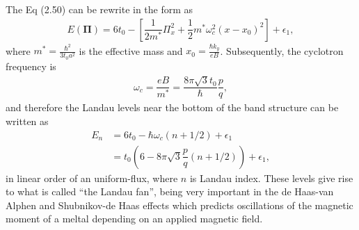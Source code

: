 \documentclass{report}
\newcommand{\f}[2]{\dfrac{#1}{#2}}
\begin{document}
The Eq (2.50) can be rewrite in the form as
\begin{gather}
	E(\mathbf{\Pi}) = 6 t_{0} - \left[\f{1}{2m^{*}} \Pi_{x}^{2} + \f{1}{2} m^{*} \omega_{c}^{2}(x - x_{0})^{2}\right] + \epsilon_{1},
\end{gather}
where $m^{*} = \frac{\hbar^{2}}{3t_{0}a^{2}}$ is the effective mass and $x_{0} = \frac{\hbar k_{y}}{eB}$. Subsequently, the cyclotron frequency is
\begin{gather}
	\omega_{c} = \f{eB}{m^{*}} = \f{8 \pi \sqrt{3} t_{0}}{\hbar}  \f{p}{q},
\end{gather}
and therefore the Landau levels near the bottom of the band structure can be written as
\begin{equation}
	\begin{aligned}
		E_{n}
		 & = 6 t_{0} - \hbar \omega_{c} (n + 1 /2) + \epsilon_{1}                    \\
		 & = t_{0} \left(6 - 8\pi\sqrt{3} \f{p}{q}( n + 1 /2)\right) + \epsilon_{1},
	\end{aligned}
\end{equation}
in linear order of an uniform-flux, where $n$ is Landau index. These levels give rise to what is called ``the Landau fan'', being very important in the de Haas-van Alphen and Shubnikov-de Haas effects \cite{10.1119/1.1615568} which predicts oscillations of the magnetic moment of a meltal depending on an applied magnetic field.
\end{document}
